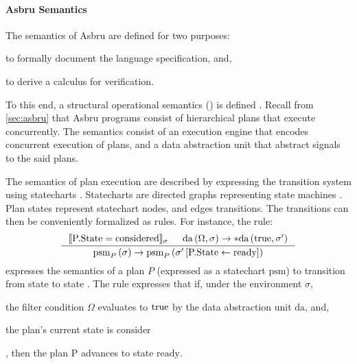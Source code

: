\paragraph{Asbru Semantics}

The semantics of Asbru are defined for two purposes:
\begin{enumerate*}[label=(\alph*)]
  \item to formally document the language specification, and,
  \item to derive a calculus for verification.
\end{enumerate*}
To this end, a structural operational semantics (\SOS{})
is defined \cite{TuriLICS97}.
Recall from \autoref{sec:asbru} that Asbru programs
consist of hierarchical plans that execute concurrently.
The semantics consist of an execution engine that encodes
concurrent execution of plans, and a data abstraction
unit that abstract signals to the said plans.

The semantics of plan execution are described by
expressing the transition system using statecharts \cite{DammCOMPOS97}.
Statecharts are directed graphs representing state machines \cite{BalserICIDP02}.
Plan states represent statechart nodes, and edges transitions. The transitions
can then be conveniently formalized as \SOS{} rules. For instance, the rule:
\begin{equation}
\inference{\llbracket \text{P.State}=\text{considered}\rrbracket_{\sigma} &
\text{da}\left(\Omega, \sigma \right) \rightarrow \ast\text{da}\left(\true{},
\sigma^{\prime}\right)}
{\text{psm}_P\left(\sigma\right) \rightarrow
\text{psm}_P\left(\sigma^{\prime}\left[\text{P.State} \leftarrow
\text{ready}\right]\right)}
\end{equation}
expresses the semantics of a plan $P$ (expressed as a statechart $\text{psm}$)
to transition from state 
to state . The \SOS{} rule expresses that
if, under the environment $\sigma$,
\begin{enumerate*}[label=(\roman*)]
  \item the filter condition $\Omega$ evaluates to $\text{true}$ by the data
    abstraction unit $\text{da}$, and,
  \item the plan's current state is $\text{consider}$
\end{enumerate*},
then the plan $\text{P}$ advances to state $\text{ready}$.

